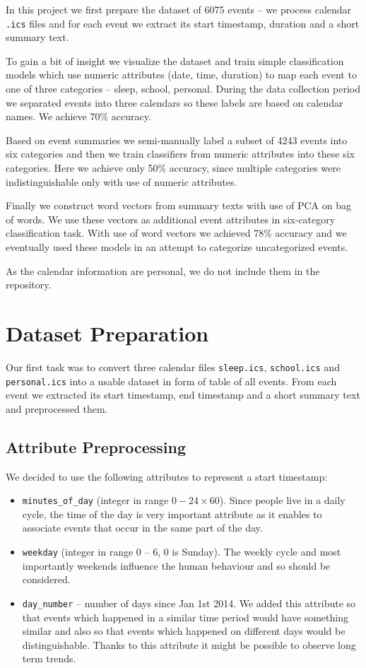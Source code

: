 \documentclass[a4paper, 12pt]{article}
\begin{document}
\medskip

In this project we first prepare the dataset of 6075 events -- we process calendar 
\texttt{.ics} files and for each event we extract its start timestamp, 
duration and a short summary text.

To gain a bit of insight we visualize the dataset and train simple 
classification models which use numeric attributes (date, time, duration)
to map each event to one of three categories -- sleep, school, personal.
During the data collection period we separated events into three calendars
so these labels are based on calendar names. We achieve 70\% accuracy.

Based on event summaries we semi-manually label a subset of 4243 events into 
six categories and then we train classifiers from numeric attributes 
into these six categories. Here we achieve only 50\% accuracy, since 
multiple categories were indistinguishable only with use of numeric attributes.

Finally we construct word vectors from summary texts with use of PCA on bag of words. 
We use these vectors as additional event attributes in six-category
classification task. With use of word vectors we achieved 78\% accuracy
and we eventually used these models in an attempt to categorize uncategorized events.

\medskip
As the calendar information are personal, we do not include them in the repository.

\section{Dataset Preparation}
Our first task was to convert three calendar files 
\texttt{sleep.ics}, \texttt{school.ics} and \texttt{personal.ics} into a usable
dataset in form of table of all events. From each event we extracted its start
timestamp, end timestamp and a short summary text and preprocessed them.

\subsection{Attribute Preprocessing}
We decided to use the following attributes to represent a start timestamp:
\begin{itemize}
\setlength\itemsep{0.1em}
\item \texttt{minutes\_of\_day} (integer in range $0 - 24 \times 60$). 
Since people live in a daily cycle, the time of the day is very 
important attribute as it enables to associate events that occur 
in the same part of the day.
\item \texttt{weekday} (integer in range 0 -- 6, 0 is Sunday). The weekly cycle and most 
importantly weekends influence the human behaviour and so should be considered.
\item \texttt{day\_number} -- number of days since Jan 1st 2014. We added this
attribute so that events which happened in a similar time period would have
something similar and also so that events which happened on different days
would be distinguishable. Thanks to this attribute it might be possible to observe
long term trends.
\end{itemize}
\end{document}

